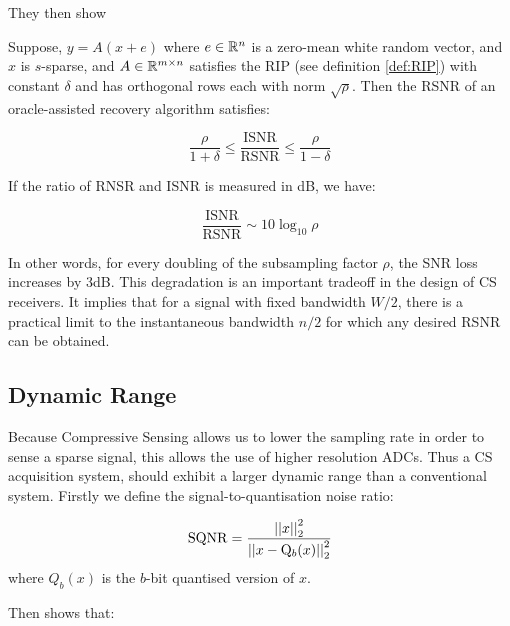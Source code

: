They then show

\begin{theorem}
Suppose, \(y= A(x+e)\) where \(e \in {\mathbb{R}}^n\) is a zero-mean white random vector, and \(x\) is \(s\)-sparse, and \(A \in {\mathbb{R}}^{m \times n}\) satisfies the RIP (see definition \eqref{def:RIP}) with constant \(\delta\) and has orthogonal rows each with norm \(\sqrt{\rho}\). Then the RSNR of an oracle-assisted recovery algorithm satisfies:

\begin{equation}
\frac{\rho}{1+\delta} \leq \frac{\mathrm{ISNR}}{\mathrm{RSNR}} \leq \frac{\rho}{1-\delta}
\end{equation}

If the ratio of RNSR and ISNR is measured in dB, we have:

\begin{equation}
\frac{\mathrm{ISNR}}{\mathrm{RSNR}} \sim 10\log_{10}{\rho}
\end{equation}

\end{theorem}

In other words, for every doubling of the subsampling factor \(\rho\), the SNR loss increases by 3dB. This degradation is an important tradeoff in the design of CS receivers. It implies that for a signal with fixed bandwidth \(W/2\), there is a practical limit to the instantaneous bandwidth \(n/2\) for which any desired RSNR can be obtained. 

\subsection{Dynamic Range}
Because Compressive Sensing allows us to lower the sampling rate in order to sense a sparse signal, this allows the use of higher resolution ADCs. Thus a CS acquisition system, should exhibit a larger dynamic range than a conventional system. Firstly we define the signal-to-quantisation noise ratio:

\begin{definition}
\begin{equation}
\mathrm{SQNR} = \frac{\left|\left|x\right|\right|_2^2}{\left|\left|x-\mathrm{Q}_b(x)\right|\right|_2^2}
\end{equation}
where \(Q_b(x)\) is the \(b\)-bit quantised version of \(x\).
\end{definition}

Then \cite{davenport2012pros} shows that:

